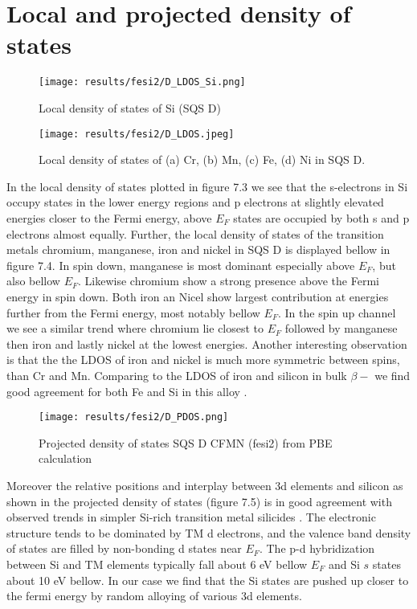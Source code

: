 \newpage
\section{Local and projected density of states}
  
\begin{figure}[H]
	\centering
	\texttt{[image: results/fesi2/D\_LDOS\_Si.png]}
	\caption{Local density of states of Si (SQS D)}
\end{figure} 

\begin{figure}[H]
	\centering
	\texttt{[image: results/fesi2/D\_LDOS.jpeg]}
	\caption{Local density of states of (a) Cr, (b) Mn, (c) Fe, (d) Ni in SQS D.}
\end{figure}   
  
In the local density of states plotted in figure 7.3 we see that the s-electrons in Si occupy states in the lower energy regions and p electrons at slightly elevated energies closer to the Fermi energy, above $E_F$ states are occupied by both s and p electrons almost equally. Further, the local density of states of the transition metals chromium, manganese, iron and nickel in SQS D is displayed bellow in figure 7.4. In spin down, manganese is most dominant especially above $E_F$, but also bellow $E_F$. Likewise chromium show a strong presence above the Fermi energy in spin down. Both iron an Nicel show largest contribution at energies further from the Fermi energy, most notably bellow $E_F$. In the spin up channel we see a similar trend where chromium lie closest to $E_F$ followed by manganese then iron and lastly nickel at the lowest energies. Another interesting observation is that the the LDOS of iron and nickel is much more symmetric between spins, than Cr and Mn. Comparing to the LDOS of iron and silicon in bulk $\beta-$  \cite{doi:10.1063/1.346415} we find good agreement for both Fe and Si in this alloy .

\begin{figure}[H]
	\centering
	\texttt{[image: results/fesi2/D\_PDOS.png]}
	\caption{Projected density of states SQS D CFMN (fesi2) from PBE calculation}
\end{figure} 

Moreover the relative positions and interplay between 3d elements and silicon as shown in the projected density of states (figure 7.5) is in good agreement with observed trends in simpler Si-rich transition metal silicides \cite{lange1997electronic}. The electronic structure tends to be dominated by TM d electrons, and the valence band density of states are filled by non-bonding d states near $E_F$. The p-d hybridization between Si and TM elements typically fall about 6 eV bellow $E_F$ and Si $s$ states about 10 eV bellow. In our case we find that the Si states are pushed up closer to the fermi energy by random alloying of various 3d elements.    

